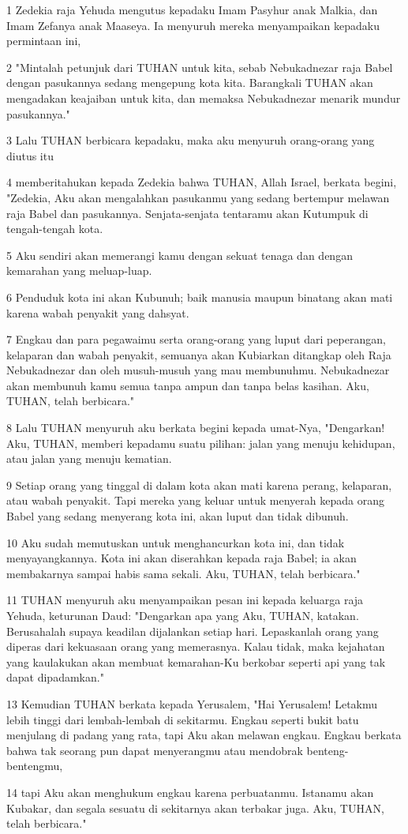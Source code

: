 \par 1 Zedekia raja Yehuda mengutus kepadaku Imam Pasyhur anak Malkia, dan Imam Zefanya anak Maaseya. Ia menyuruh mereka menyampaikan kepadaku permintaan ini,
\par 2 "Mintalah petunjuk dari TUHAN untuk kita, sebab Nebukadnezar raja Babel dengan pasukannya sedang mengepung kota kita. Barangkali TUHAN akan mengadakan keajaiban untuk kita, dan memaksa Nebukadnezar menarik mundur pasukannya."
\par 3 Lalu TUHAN berbicara kepadaku, maka aku menyuruh orang-orang yang diutus itu
\par 4 memberitahukan kepada Zedekia bahwa TUHAN, Allah Israel, berkata begini, "Zedekia, Aku akan mengalahkan pasukanmu yang sedang bertempur melawan raja Babel dan pasukannya. Senjata-senjata tentaramu akan Kutumpuk di tengah-tengah kota.
\par 5 Aku sendiri akan memerangi kamu dengan sekuat tenaga dan dengan kemarahan yang meluap-luap.
\par 6 Penduduk kota ini akan Kubunuh; baik manusia maupun binatang akan mati karena wabah penyakit yang dahsyat.
\par 7 Engkau dan para pegawaimu serta orang-orang yang luput dari peperangan, kelaparan dan wabah penyakit, semuanya akan Kubiarkan ditangkap oleh Raja Nebukadnezar dan oleh musuh-musuh yang mau membunuhmu. Nebukadnezar akan membunuh kamu semua tanpa ampun dan tanpa belas kasihan. Aku, TUHAN, telah berbicara."
\par 8 Lalu TUHAN menyuruh aku berkata begini kepada umat-Nya, "Dengarkan! Aku, TUHAN, memberi kepadamu suatu pilihan: jalan yang menuju kehidupan, atau jalan yang menuju kematian.
\par 9 Setiap orang yang tinggal di dalam kota akan mati karena perang, kelaparan, atau wabah penyakit. Tapi mereka yang keluar untuk menyerah kepada orang Babel yang sedang menyerang kota ini, akan luput dan tidak dibunuh.
\par 10 Aku sudah memutuskan untuk menghancurkan kota ini, dan tidak menyayangkannya. Kota ini akan diserahkan kepada raja Babel; ia akan membakarnya sampai habis sama sekali. Aku, TUHAN, telah berbicara."
\par 11 TUHAN menyuruh aku menyampaikan pesan ini kepada keluarga raja Yehuda, keturunan Daud: "Dengarkan apa yang Aku, TUHAN, katakan. Berusahalah supaya keadilan dijalankan setiap hari. Lepaskanlah orang yang diperas dari kekuasaan orang yang memerasnya. Kalau tidak, maka kejahatan yang kaulakukan akan membuat kemarahan-Ku berkobar seperti api yang tak dapat dipadamkan."
\par 13 Kemudian TUHAN berkata kepada Yerusalem, "Hai Yerusalem! Letakmu lebih tinggi dari lembah-lembah di sekitarmu. Engkau seperti bukit batu menjulang di padang yang rata, tapi Aku akan melawan engkau. Engkau berkata bahwa tak seorang pun dapat menyerangmu atau mendobrak benteng-bentengmu,
\par 14 tapi Aku akan menghukum engkau karena perbuatanmu. Istanamu akan Kubakar, dan segala sesuatu di sekitarnya akan terbakar juga. Aku, TUHAN, telah berbicara."

